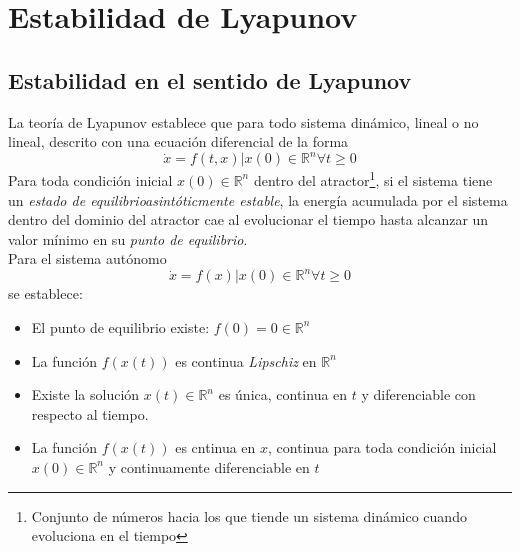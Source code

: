 \documentclass[12pt,spanish,lettersize]{report}
\begin{document}
\section{Estabilidad de Lyapunov}
\subsection{Estabilidad en el sentido de Lyapunov}
La teor\'ia de Lyapunov establece que para todo sistema din\'amico, lineal o no lineal, descrito con una ecuaci\'on diferencial de la forma
\begin{equation}\label{SistemaLineal}
\dot{x}=f(t,x) | x(0)\in\mathbb{R}^n \forall t\ge0
\end{equation}
Para toda condici\'on inicial $x(0)\in\mathbb{R}^n$ dentro del atractor\footnote{Conjunto de n\'umeros hacia los que tiende un sistema din\'amico cuando evoluciona en el tiempo}, si el sistema tiene un \emph{estado de equilibrioasint\'oticmente estable}, la energ\'ia acumulada por el sistema dentro del dominio del atractor cae al evolucionar  el tiempo hasta alcanzar un valor m\'inimo en su \emph{punto de equilibrio}.\\
Para el sistema aut\'onomo
\begin{equation}\label{SistemaAutonomo}
\dot{x}=f(x) | x(0)\in\mathbb{R}^n \forall t\ge0
\end{equation}
se establece:
\begin{itemize}
\item El punto de equilibrio existe: $f(0)=0 \in\mathbb{R}^n$
\item La funci\'on $f(x(t))$ es continua \emph{Lipschiz} en $\mathbb{R}^n$
\item Existe la soluci\'on $x(t)\in\mathbb{R}^n$ es \'unica, continua en $t$ y diferenciable con respecto al tiempo.
\item La funci\'on $f(x(t))$ es cntinua en $x$, continua para toda condici\'on inicial $x(0)\in\mathbb{R}^n$ y continuamente diferenciable en $t$
\end{itemize}
\end{document}
